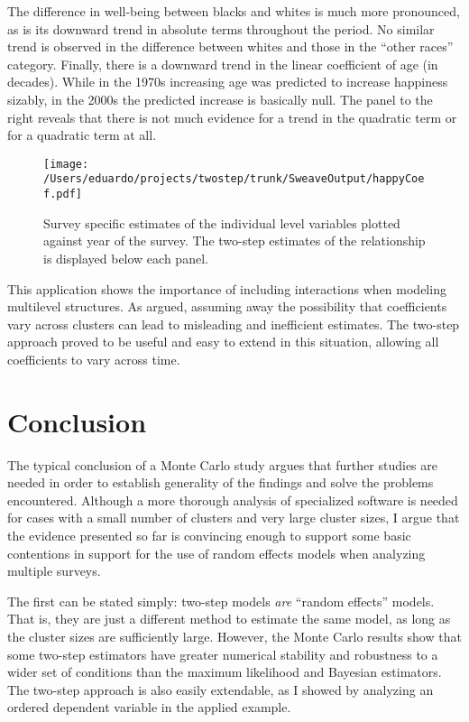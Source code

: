 The difference in well-being between blacks and whites is much more pronounced, as is its downward trend in absolute terms throughout the period. No similar trend is observed in the difference between whites and those in the ``other races'' category. Finally, there is a downward trend in the linear coefficient of age (in decades). While in  the 1970s increasing age was predicted to increase happiness sizably, in the 2000s the predicted increase is basically null. The panel to the right reveals that there is not much evidence for a trend in the quadratic term or for a quadratic term at all.





\begin{figure}
  \centering
  \texttt{[image: /Users/eduardo/projects/twostep/trunk/SweaveOutput/happyCoef.pdf]}
  \caption{Survey specific estimates of the individual level variables plotted against year of the survey. The two-step estimates of the relationship is displayed below each panel.}
  \label{fig:happyCoef}
\end{figure}

This application shows the  importance of including interactions when modeling multilevel structures. As \citet{western:1998} argued,  assuming away the possibility that coefficients vary across clusters can lead to misleading and inefficient estimates. The two-step approach proved to be useful and easy to extend in this situation, allowing all coefficients to vary across time.

\section{Conclusion}

The typical conclusion of a Monte Carlo study argues that further studies are needed in order to establish generality of the findings and solve the problems encountered.  Although a more thorough analysis of specialized software is needed for cases with a small number of clusters and very large cluster sizes, I argue that the evidence presented so far is convincing enough to support some basic contentions in support for the use of random effects models when analyzing multiple surveys.

The first can be stated simply: two-step models \emph{are} ``random effects'' models. That is, they are just a different method to estimate the same model, as long as the cluster sizes are sufficiently large.  However, the Monte Carlo results show that some two-step estimators have greater  numerical stability and robustness to a wider set of conditions than the maximum likelihood and Bayesian estimators. The two-step approach is also easily extendable, as I showed by analyzing an ordered dependent variable in the applied example.

